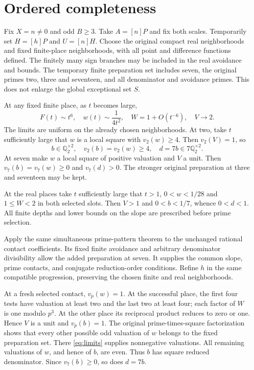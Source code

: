 \documentclass[11pt,a4paper]{article}
\newcommand{\Q}{\mathbb Q}\newcommand{\Z}{\mathbb Z}
\begin{document}
\section{Ordered completeness}
Fix $X=n\ne0$ and odd $B\ge3$. Take $A=[n]P$ and fix both scales.
Temporarily set $H=[h]P$ and $U=[n]H$. Choose the original compact
real neighborhoods and fixed finite-place neighborhoods, with all
point and difference functions defined. The finitely many sign
branches may be included in the real avoidance and bounds.
The temporary finite preparation set includes seven, the original
primes two, three and seventeen, and all denominator and avoidance
primes. This does not enlarge the global exceptional set $S$.

At any fixed finite place, as $t$ becomes large,
\begin{equation}\label{eq:limits}
 F(t)\sim t^6,\quad w(t)\sim\frac1{4t^2},\quad
 W=1+O(t^{-6}),\quad V\longrightarrow2.
\end{equation}
The limits are uniform on the already chosen neighborhoods. At two,
take $t$ sufficiently large that $w$ is a local square with
$v_2(w)\ge4$. Then $v_2(V)=1$, so
\[
 b\in\Q_2^{\times2},\quad v_2(b)=v_2(w)\ge4,\quad
 d=7b\in7\Q_2^{\times2}.
\]
At seven make $w$ a local square of positive valuation and $V$ a unit.
Then $v_7(b)=v_7(w)\ge0$ and $v_7(d)>0$. The stronger original
preparation at three and seventeen may be kept.

At the real places take $t$ sufficiently large that $t>1$,
$0<w<1/28$ and $1\le W<2$ in both selected slots.
Then $V>1$ and $0<b<1/7$, whence $0<d<1$.
All finite depths and lower bounds on the slope are prescribed before
prime selection.

Apply the same simultaneous prime-pattern theorem to the unchanged
rational contact coefficients. Its fixed finite avoidance and
arbitrary denominator divisibility allow the added preparation at
seven. It supplies the common slope, prime contacts, and conjugate
reduction-order conditions. Refine $h$ in the same compatible
progression, preserving the chosen finite and real neighborhoods.

At a fresh selected contact, $v_p(w)=1$. At the successful
place, the first four tests have valuation at least two and the last
two at least four; each factor of $W$ is one modulo $p^3$. At the
other place its reciprocal product reduces to zero or one. Hence
$V$ is a unit and $v_p(b)=1$.
The original prime-times-square factorization shows that every other
possible odd valuation of $w$ belongs to the fixed preparation set.
There \eqref{eq:limits} supplies nonnegative valuations. All remaining
valuations of $w$, and hence of $b$, are even. Thus $b$ has
square reduced denominator. Since $v_7(b)\ge0$, so does $d=7b$.
\end{document}
